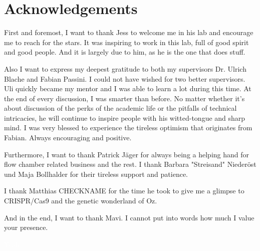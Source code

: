 \section*{Acknowledgements}
First and foremost, I want to thank Jess to welcome me in his lab and encourage me to reach for the stars. It was inspiring to work in this lab, full of good spirit and good people. And it is largely due to him, as he is the one that does stuff. 

Also I want to express my deepest gratitude to both my supervisors Dr. Ulrich Blache and Fabian Passini. I could not have wished for two better supervisors. Uli quickly became my mentor and I was able to learn a lot during this time. At the end of every discussion, I was smarter than before. No matter whether it's about discussion of the perks of the academic life or the pitfalls of technical intricacies, he will continue to inspire people with his witted-tongue and sharp mind. I was very blessed to experience the tireless optimism that originates from Fabian. Always encouraging and positive.

Furthermore, I want to thank Patrick Jäger for always being a helping hand for flow chamber related business and the rest. I thank Barbara "Streisand" Niederöst und Maja Bollhalder for their tireless support and patience. 

I thank Matthias CHECKNAME for the time he took to give me a glimpse to CRISPR/Cas9 and the genetic wonderland of Oz. 

And in the end, I want to thank Mavi. I cannot put into words how much I value your presence. 

\clearpage
\textcolor{white}{Yeah}
\clearpage
